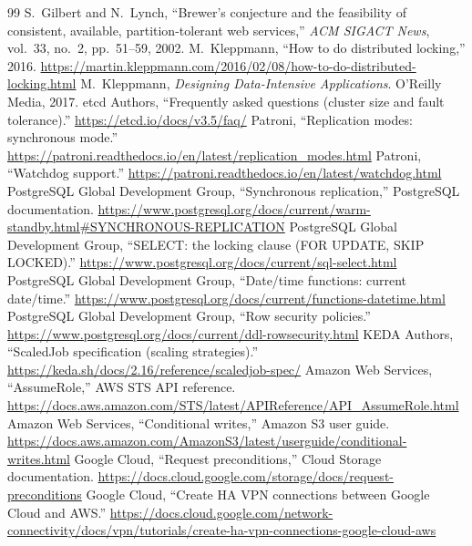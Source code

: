 \documentclass[10pt,a4paper]{article}
\begin{document}
\clearpage
{}
\renewcommand{\thepage}{R\arabic{page}}
\setcounter{page}{1}
\begin{thebibliography}{99}\small
\setlength{\itemsep}{1pt}
 S.~Gilbert and N.~Lynch, ``Brewer's conjecture and the feasibility of consistent, available,
  partition-tolerant web services,'' \emph{ACM SIGACT News}, vol.~33, no.~2, pp.~51--59, 2002.
 M.~Kleppmann, ``How to do distributed locking,'' 2016.
  \url{https://martin.kleppmann.com/2016/02/08/how-to-do-distributed-locking.html}
 M.~Kleppmann, \emph{Designing Data-Intensive Applications}. O'Reilly Media, 2017.
 etcd Authors, ``Frequently asked questions (cluster size and fault tolerance).''
  \url{https://etcd.io/docs/v3.5/faq/}
 Patroni, ``Replication modes: synchronous mode.''
  \url{https://patroni.readthedocs.io/en/latest/replication_modes.html}
 Patroni, ``Watchdog support.'' \url{https://patroni.readthedocs.io/en/latest/watchdog.html}
 PostgreSQL Global Development Group, ``Synchronous replication,'' PostgreSQL documentation.
  \url{https://www.postgresql.org/docs/current/warm-standby.html#SYNCHRONOUS-REPLICATION}
 PostgreSQL Global Development Group, ``SELECT: the locking clause (FOR UPDATE, SKIP LOCKED).''
  \url{https://www.postgresql.org/docs/current/sql-select.html}
 PostgreSQL Global Development Group, ``Date/time functions: current date/time.''
  \url{https://www.postgresql.org/docs/current/functions-datetime.html}
 PostgreSQL Global Development Group, ``Row security policies.''
  \url{https://www.postgresql.org/docs/current/ddl-rowsecurity.html}
 KEDA Authors, ``ScaledJob specification (scaling strategies).'' \url{https://keda.sh/docs/2.16/reference/scaledjob-spec/}
 Amazon Web Services, ``AssumeRole,'' AWS STS API reference.
  \url{https://docs.aws.amazon.com/STS/latest/APIReference/API_AssumeRole.html}
 Amazon Web Services, ``Conditional writes,'' Amazon S3 user guide.
  \url{https://docs.aws.amazon.com/AmazonS3/latest/userguide/conditional-writes.html}
 Google Cloud, ``Request preconditions,'' Cloud Storage documentation.
  \url{https://docs.cloud.google.com/storage/docs/request-preconditions}
 Google Cloud, ``Create HA VPN connections between Google Cloud and AWS.''
  \url{https://docs.cloud.google.com/network-connectivity/docs/vpn/tutorials/create-ha-vpn-connections-google-cloud-aws}

\end{thebibliography}
\end{document}

